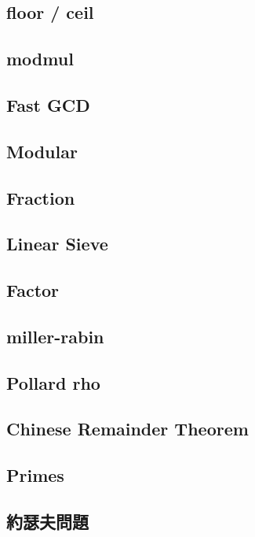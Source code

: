 \subsection{floor / ceil}

\subsection{modmul}

\subsection{Fast GCD}

\subsection{Modular}

\subsection{Fraction}

\subsection{Linear Sieve}

\subsection{Factor}

\subsection{miller-rabin}

\subsection{Pollard rho}

\subsection{Chinese Remainder Theorem}

\subsection{Primes}

\subsection{約瑟夫問題}

